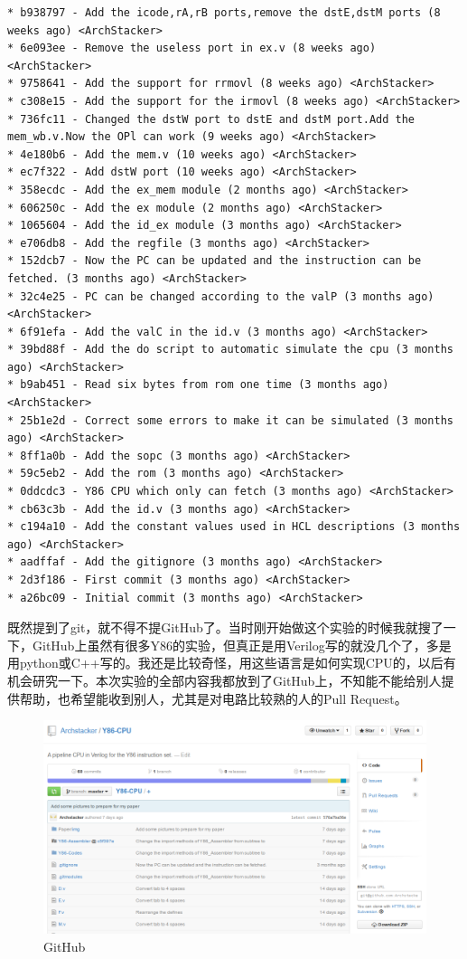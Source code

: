 \documentclass[12pt]{article}
\begin{document}
\begin{CJK*}{GB}{gbsn}
\begin{verbatim}
* b938797 - Add the icode,rA,rB ports,remove the dstE,dstM ports (8 weeks ago) <ArchStacker>
* 6e093ee - Remove the useless port in ex.v (8 weeks ago) <ArchStacker>
* 9758641 - Add the support for rrmovl (8 weeks ago) <ArchStacker>
* c308e15 - Add the support for the irmovl (8 weeks ago) <ArchStacker>
* 736fc11 - Changed the dstW port to dstE and dstM port.Add the mem_wb.v.Now the OPl can work (9 weeks ago) <ArchStacker>
* 4e180b6 - Add the mem.v (10 weeks ago) <ArchStacker>
* ec7f322 - Add dstW port (10 weeks ago) <ArchStacker>
* 358ecdc - Add the ex_mem module (2 months ago) <ArchStacker>
* 606250c - Add the ex module (2 months ago) <ArchStacker>
* 1065604 - Add the id_ex module (3 months ago) <ArchStacker>
* e706db8 - Add the regfile (3 months ago) <ArchStacker>
* 152dcb7 - Now the PC can be updated and the instruction can be fetched. (3 months ago) <ArchStacker>
* 32c4e25 - PC can be changed according to the valP (3 months ago) <ArchStacker>
* 6f91efa - Add the valC in the id.v (3 months ago) <ArchStacker>
* 39bd88f - Add the do script to automatic simulate the cpu (3 months ago) <ArchStacker>
* b9ab451 - Read six bytes from rom one time (3 months ago) <ArchStacker>
* 25b1e2d - Correct some errors to make it can be simulated (3 months ago) <ArchStacker>
* 8ff1a0b - Add the sopc (3 months ago) <ArchStacker>
* 59c5eb2 - Add the rom (3 months ago) <ArchStacker>
* 0ddcdc3 - Y86 CPU which only can fetch (3 months ago) <ArchStacker>
* cb63c3b - Add the id.v (3 months ago) <ArchStacker>
* c194a10 - Add the constant values used in HCL descriptions (3 months ago) <ArchStacker>
* aadffaf - Add the gitignore (3 months ago) <ArchStacker>
* 2d3f186 - First commit (3 months ago) <ArchStacker>
* a26bc09 - Initial commit (3 months ago) <ArchStacker>
\end{verbatim}

既然提到了git，就不得不提GitHub了。当时刚开始做这个实验的时候我就搜了一下，GitHub上虽然有很多Y86的实验，但真正是用Verilog写的就没几个了，多是用python或C++写的。我还是比较奇怪，用这些语言是如何实现CPU的，以后有机会研究一下。本次实验的全部内容我都放到了GitHub上，不知能不能给别人提供帮助，也希望能收到别人，尤其是对电路比较熟的人的Pull
Request。

\begin{figure}[htbp]
\centering
\includegraphics{img/GitHub.png}
\caption{GitHub}
\end{figure}


\end{CJK*}
\end{document}
